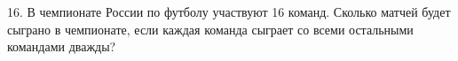 16. В чемпионате России по футболу участвуют 16 команд. Сколько матчей будет сыграно в чемпионате, если каждая команда сыграет со всеми остальными командами дважды?\\
